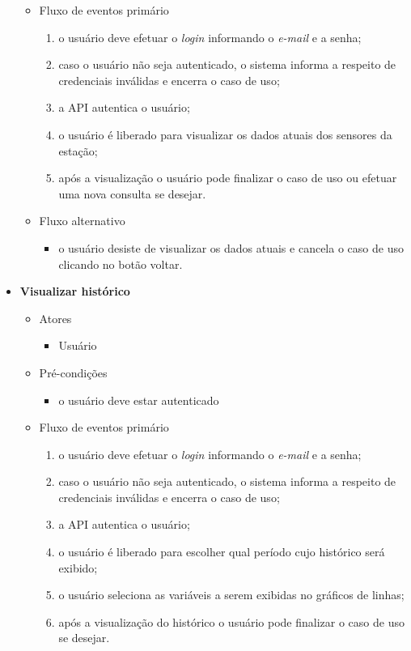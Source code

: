 \begin{itemize}
\begin{itemize}
	    	\item Fluxo de eventos primário
			    \begin{enumerate}
		    	    \item o usuário deve efetuar o \textit{login} informando o \textit{e-mail} e a senha;
	    		    \item caso o usuário não seja autenticado, o sistema informa a respeito de credenciais inválidas e encerra o caso de uso;
		    	    \item a API autentica o usuário;
    			    \item o usuário é liberado para visualizar os dados atuais dos sensores da estação;
		        	\item após a visualização o usuário pode finalizar o caso de uso ou efetuar uma nova consulta se desejar.
			    \end{enumerate}

    		\item Fluxo alternativo
			    \begin{itemize}
    			   \item o usuário desiste de visualizar os dados atuais e cancela o caso de uso clicando no botão voltar.
			    \end{itemize}

		\end{itemize}

	\item \textbf{Visualizar histórico}

		\begin{itemize}
		    \item Atores
	    		\begin{itemize}
		    	    \item Usuário
	    		\end{itemize}

	    	\item Pré-condições
    			\begin{itemize}
			        \item o usuário deve estar autenticado
			    \end{itemize}

		    \item Fluxo de eventos primário
			    \begin{enumerate}
			        \item o usuário deve efetuar o \textit{login} informando o \textit{e-mail} e a senha;
			        \item caso o usuário não seja autenticado, o sistema informa a respeito de credenciais inválidas e encerra o caso de uso;
			        \item a API autentica o usuário;
			        \item o usuário é liberado para escolher qual período cujo histórico será exibido;
			        \item o usuário seleciona as variáveis a serem exibidas no gráficos de linhas;
			        \item após a visualização do histórico o usuário pode finalizar o caso de uso se desejar.
			    \end{enumerate}


\end{itemize}
\end{itemize}
